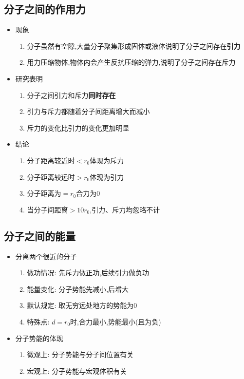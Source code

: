 \documentclass{article}
\begin{document}
\subsection{分子之间的作用力}
\begin{itemize}
    \item 现象
          \begin{enumerate}[label = (\arabic*)]
              \item 分子虽然有空隙,大量分子聚集形成固体或液体说明了分子之间存在\textbf{引力}
              \item 用力压缩物体,物体内会产生反抗压缩的弹力,说明了分子之间存在斥力
          \end{enumerate}
    \item 研究表明
          \begin{enumerate}[label = (\arabic*)]
              \item 分子之间引力和斥力\textbf{同时存在}
              \item 引力与斥力都随着分子间距离增大而减小
              \item 斥力的变化比引力的变化更加明显
          \end{enumerate}
    \item 结论
          \begin{enumerate}[label = (\arabic*)]
              \item 分子距离较近时$<r_{0}$体现为斥力
              \item 分子距离较远时$>r_{0}$体现为引力
              \item 分子距离为$=r_{0}$合力为$0$
              \item 当分子间距离$>10r_{0}$,引力、斥力均忽略不计
          \end{enumerate}

\end{itemize}

\vspace{2em}

\subsection{分子之间的能量}
\begin{itemize}
    \item 分离两个很近的分子
          \begin{enumerate}[label = (\arabic*)]
              \item 做功情况: 先斥力做正功,后续引力做负功
              \item 能量变化: 分子势能先减小,后增大
              \item 默认规定: 取无穷远处地方的势能为$0$
              \item 特殊点: $d = r_{0}$时,合力最小,势能最小(且为负)
          \end{enumerate}
    \item 分子势能的体现
          \begin{enumerate}[label = (\arabic*)]
              \item 微观上: 分子势能与分子间位置有关
              \item 宏观上: 分子势能与宏观体积有关
          \end{enumerate}
\end{itemize}
\end{document}
